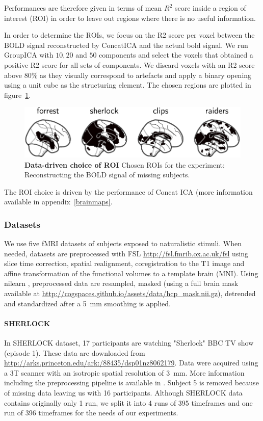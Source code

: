 Performances are therefore given in terms of mean $R^2$ score inside a region of interest (ROI)
in order to leave out regions where there is no useful information.

In order to determine the ROIs, we focus on the R2 score per voxel between the BOLD signal reconstructed by ConcatICA and the actual bold signal. We run GroupICA with $10, 20$ and $50$ components and select the voxels that obtained a positive R2 score for all sets of components.
% 
We discard voxels with an R2 score above 80\% as they visually correspond to artefacts and apply a binary opening using a unit cube as the structuring element. The chosen regions are plotted in figure~\ref{fig:roi}.

\begin{figure}
  \centering
  \includegraphics[width=\textwidth]{figures/mvica/reconstruction_score_roi.pdf}
  \caption{\textbf{Data-driven choice of ROI} Chosen ROIs for the experiment: Reconstructing the BOLD signal of missing subjects.}
  \label{fig:roi}
\end{figure}

The ROI choice is driven by the performance of Concat ICA (more information
available in appendix~\ref{brainmaps}.
\subsubsection{Datasets}

We use five fMRI datasets of subjects exposed to naturalistic stimuli. When needed, datasets are preprocessed with FSL \url{http://fsl.fmrib.ox.ac.uk/fsl} using slice time correction, spatial realignment, coregistration to the T1 image and affine transformation of the functional volumes to a template brain (MNI). Using nilearn \cite{abraham2014machine}, preprocessed data are resampled, masked (using a full brain mask available at \url{http://cogspaces.github.io/assets/data/hcp_mask.nii.gz}), detrended and standardized after a 5 mm smoothing is applied.  
%
\paragraph{SHERLOCK}
In SHERLOCK dataset, 17 participants are watching "Sherlock" BBC TV show (episode 1). 
%
These data are downloaded from \url{http://arks.princeton.edu/ark:/88435/dsp01nz8062179}. 
%
Data were acquired using a 3T scanner with an isotropic spatial resolution of 3 mm. 
%
More information including the preprocessing pipeline is available in \cite{sherlock}.
%
Subject 5 is removed because of missing data leaving us with 16 participants.
%
Although SHERLOCK data contains originally only 1 run, we split it into 4 runs of 395 timeframes and one run of 396 timeframes for the needs of our experiments. 


